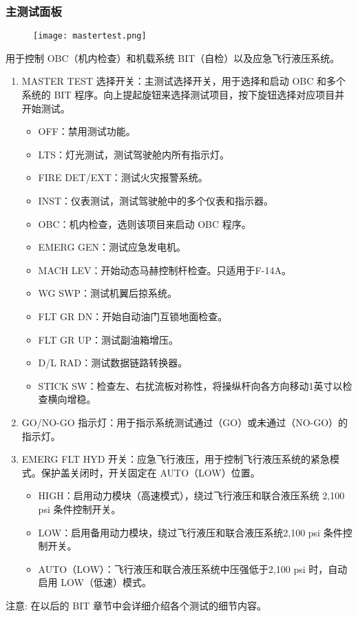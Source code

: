 \subsubsection{主测试面板}

\begin{figure}[htb]
	\centering
	\texttt{[image: mastertest.png]}
\end{figure}

用于控制 OBC（机内检查）和机载系统 BIT（自检）以及应急飞行液压系统。

\begin{enumerate}
	\item MASTER TEST 选择开关：主测试选择开关，用于选择和启动 OBC 和多个系统的 BIT 程序。向上提起旋钮来选择测试项目，按下旋钮选择对应项目并开始测试。
	      \begin{itemize}
		      \item OFF：禁用测试功能。
		      \item LTS：灯光测试，测试驾驶舱内所有指示灯。
		      \item FIRE DET/EXT：测试火灾报警系统。
		      \item INST：仪表测试，测试驾驶舱中的多个仪表和指示器。
		      \item OBC：机内检查，选则该项目来启动 OBC 程序。
		      \item EMERG GEN：测试应急发电机。
		      \item MACH LEV：开始动态马赫控制杆检查。只适用于F-14A。
		      \item WG SWP：测试机翼后掠系统。
		      \item FLT GR DN：开始自动油门互锁地面检查。
		      \item FLT GR UP：测试副油箱增压。
		      \item D/L RAD：测试数据链路转换器。
		      \item STICK SW：检查左、右扰流板对称性，将操纵杆向各方向移动1英寸以检查横向增稳。
	      \end{itemize}
	\item GO/NO-GO 指示灯：用于指示系统测试通过（GO）或未通过（NO-GO）的指示灯。
	\item EMERG FLT HYD 开关：应急飞行液压，用于控制飞行液压系统的紧急模式。保护盖关闭时，开关固定在 AUTO（LOW）位置。
	      \begin{itemize}
		      \item HIGH：启用动力模块（高速模式），绕过飞行液压和联合液压系统 2,100 psi 条件控制开关。
		      \item LOW：启用备用动力模块，绕过飞行液压和联合液压系统2,100 psi 条件控制开关。
		      \item AUTO（LOW）：飞行液压和联合液压系统中压强低于2,100 psi 时，自动启用 LOW（低速）模式。
	      \end{itemize}
\end{enumerate}
注意:	在以后的 BIT 章节中会详细介绍各个测试的细节内容。

